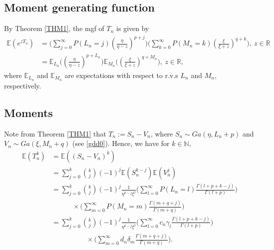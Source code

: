 \documentclass[12pt, a4paper,reqno]{amsart}
\theoremstyle{definition}
\theoremstyle{myremark}
\numberwithin{equation}{section}
\begin{document}
\subsection{Moment generating function}\label{cflcbg} By Theorem \ref{THM1}, the mgf of $T_n$ is given by
\begin{align}
\label{mggd1}	\mathbb{E}(e^{zT_n}) &=\bigg(\sum_{j=0}^{\infty}P(L_n=j) \left( \frac{\eta}{\eta -z} \right)^{p+j}\bigg)\bigg(\sum_{k=0}^{\infty}P(M_n=k)\left( \frac{\xi}{\xi +z} \right)^{q+k}\bigg),~z\in\mathbb{R}\\
&=\mathbb{E}_{L_n}\bigg(\left( \frac{\eta}{\eta -z} \right)^{p+L_n}\bigg) \mathbb{E}_{M_n}\bigg(\left( \frac{\xi}{\xi +z} \right)^{q+M_n}\bigg),~z\in\mathbb{R},\label{ggd1}
\end{align}
\noindent
where $\mathbb{E}_{L_n}$ and $\mathbb{E}_{M_n}$ are expectations with respect to r.v.s $L_n$ and $M_n$, respectively. 
\vspace{-.2cm}
\subsection{Moments}
 Note from Theorem \ref{THM1} that $T_n:=S_n-V_n$, where  $S_n \sim Ga(\eta,L_n+p)$ and $V_n \sim Ga(\xi, M_n+q)$ (see \eqref{gdd0}). Hence, we have for $k\in \mathbb{N},$
\begin{align}\label{momentformula}
\nonumber	\mathbb{E}\left( T_n^k  \right)&=\mathbb{E}\left( (S_n-V_n)^k  \right)\\
\nonumber	&=\sum_{j=0}^{k}\binom{k}{j}(-1)^{j}\mathbb{E}(S_n^{k-j})\mathbb{E}(V_n^j)\\
\nonumber	&=\sum_{j=0}^{k}\binom{k}{j}(-1)^{j}\frac{1}{\eta^{k-j} \xi^j}\bigg(\sum_{l=0}^{\infty}P(L_n=l) \frac{\Gamma (l+p+k-j)}{\Gamma(l+p)}   \bigg)\\
\nonumber	&\quad\quad\quad\times\bigg(\sum_{m=0}^{\infty}P(M_n=m) \frac{\Gamma (m+q+j)}{\Gamma (m+q)}   \bigg)\\
\nonumber	&=\sum_{j=0}^{k}\binom{k}{j}(-1)^{j}\frac{1}{\eta^{k-j} \xi^j}\bigg(\sum_{l=0}^{\infty}c_n\gamma_l \frac{\Gamma (l+p+k-j)}{\Gamma(l+p)}   \bigg)\\
	&\quad\quad\quad\quad\quad\times\bigg(\sum_{m=0}^{\infty}d_n\delta_m \frac{\Gamma (m+q+j)}{\Gamma (m+q)}   \bigg).
\end{align}
\end{document}
